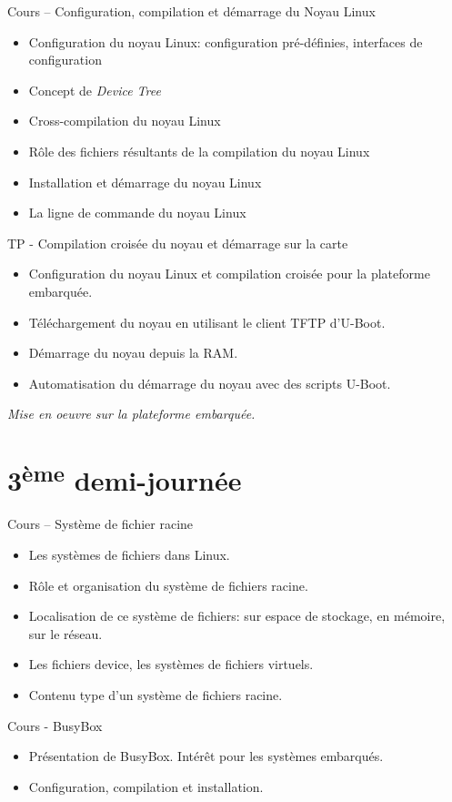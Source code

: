 \documentclass[a4paper,12pt,obeyspaces,spaces,hyphens]{article}
\begin{document}
\feagendatwocolumn
{Cours – Configuration, compilation et démarrage du Noyau Linux}
{
  \begin{itemize}
  \item Configuration du noyau Linux: configuration pré-définies,
    interfaces de configuration
  \item Concept de {\em Device Tree}
  \item Cross-compilation du noyau Linux
  \item Rôle des fichiers résultants de la compilation du noyau Linux
  \item Installation et démarrage du noyau Linux
  \item La ligne de commande du noyau Linux
  \end{itemize}
}
{TP - Compilation croisée du noyau et démarrage sur la carte}
{
  \begin{itemize}
  \item Configuration du noyau Linux et compilation croisée pour la
    plateforme embarquée.
  \item Téléchargement du noyau en utilisant le client TFTP d'U-Boot.
  \item Démarrage du noyau depuis la RAM.
  \item Automatisation du démarrage du noyau avec des scripts U-Boot.
  \end{itemize}

  \vspace{0.5cm}
  {\em Mise en oeuvre sur la plateforme embarquée.}
}

\section{3\textsuperscript{ème} demi-journée}

\feagendatwocolumn
{Cours – Système de fichier racine}
{
  \begin{itemize}
  \item Les systèmes de fichiers dans Linux.
  \item Rôle et organisation du système de fichiers racine.
  \item Localisation de ce système de fichiers: sur espace
	de stockage, en mémoire, sur le réseau.
  \item Les fichiers device, les systèmes de fichiers virtuels.
  \item Contenu type d'un système de fichiers racine.
  \end{itemize}
}
{Cours - BusyBox}
{
  \begin{itemize}
  \item Présentation de BusyBox. Intérêt pour les systèmes embarqués.
  \item Configuration, compilation et installation.
  \end{itemize}
}
\end{document}
